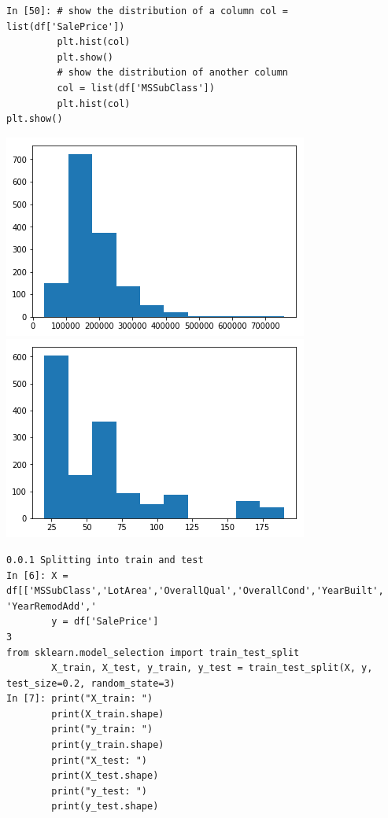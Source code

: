 \documentclass[sigconf]{acmart}
\begin{document}
\begin{lstlisting}
In [50]: # show the distribution of a column col = list(df['SalePrice'])
         plt.hist(col)
         plt.show()
         # show the distribution of another column
         col = list(df['MSSubClass'])
         plt.hist(col)
plt.show()
\end{lstlisting}

\includegraphics[width=0.95\columnwidth]{output_3_0.png}
\\
\includegraphics[width=0.95\columnwidth]{output_3_1.png}

\begin{lstlisting}
0.0.1 Splitting into train and test
In [6]: X = df[['MSSubClass','LotArea','OverallQual','OverallCond','YearBuilt', 'YearRemodAdd','
        y = df['SalePrice']
3
from sklearn.model_selection import train_test_split
        X_train, X_test, y_train, y_test = train_test_split(X, y, test_size=0.2, random_state=3)
In [7]: print("X_train: ")
        print(X_train.shape)
        print("y_train: ")
        print(y_train.shape)
        print("X_test: ")
        print(X_test.shape)
        print("y_test: ")
        print(y_test.shape)
\end{lstlisting}
\end{document}
